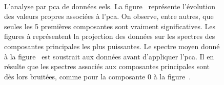 \begin{figure}[htbp]
    	\vspace{20pt}
    	\\
    	\def\comp{mean}
    	\def\comp{comp0}%
    	\caption{L'analyse par \gls{pca} de données \gls{eels}. La figure~ représente l'évolution des valeurs propres associées à l'\gls{pca}. On observe, entre autres, que seules les 5 premières composantes sont vraiment significatives. Les figures  à  représentent la projection des données sur les spectres des composantes principales les plus puissantes. Le spectre moyen donné à la figure~ est soustrait aux données avant d'appliquer l'\gls{pca}. Il en résulte que les spectres associés aux composantes principales sont dès lors bruitées, comme pour la composante 0 à la figure~.
            \protect\label{fig-ACP}} 
    \end{figure}


